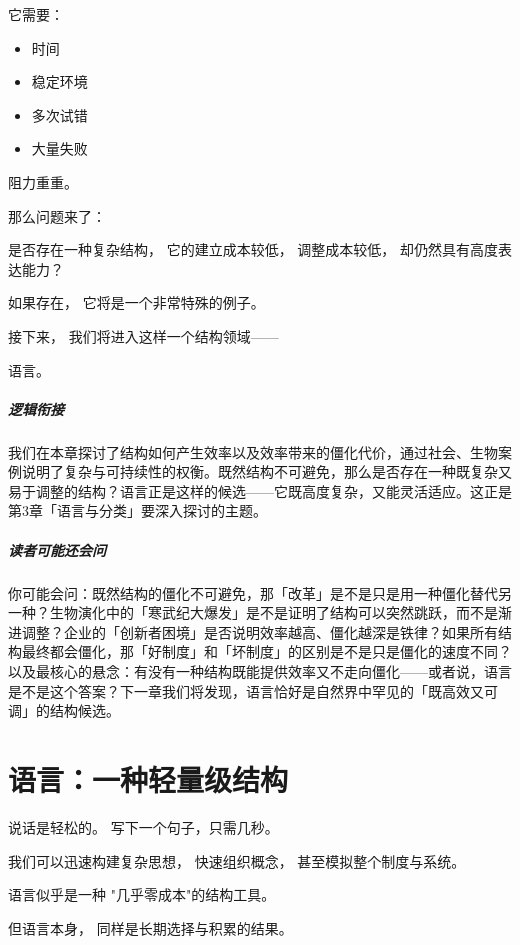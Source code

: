 \documentclass[openany, a4paper, 12pt]{book}
\newenvironment{motivation}{
	\vspace{0.5em}
	\begin{tcolorbox}[
		colback=gray!10,           %
		colframe=gray!60,          %
		title=\textit{本章动机 (Motivation)},
		fonttitle=\bfseries,
		arc=0mm,                   %
		leftrule=3mm               %
		]
		\small \itshape %
	}{
	\end{tcolorbox}
	\vspace{1em}
}
\begin{document}
它需要：

\begin{itemize}
	\item 时间
	\item 稳定环境
	\item 多次试错
	\item 大量失败
\end{itemize}

阻力重重。

那么问题来了：

\begin{questionbox}
	是否存在一种复杂结构，
	它的建立成本较低，
	调整成本较低，
	却仍然具有高度表达能力？
\end{questionbox}

如果存在，
它将是一个非常特殊的例子。

接下来，
我们将进入这样一个结构领域——

语言。

\paragraph*{逻辑衔接}
我们在本章探讨了结构如何产生效率以及效率带来的僵化代价，通过社会、生物案例说明了复杂与可持续性的权衡。既然结构不可避免，那么是否存在一种既复杂又易于调整的结构？语言正是这样的候选——它既高度复杂，又能灵活适应。这正是第3章「语言与分类」要深入探讨的主题。

\paragraph*{读者可能还会问}
你可能会问：既然结构的僵化不可避免，那「改革」是不是只是用一种僵化替代另一种？生物演化中的「寒武纪大爆发」是不是证明了结构可以突然跳跃，而不是渐进调整？企业的「创新者困境」是否说明效率越高、僵化越深是铁律？如果所有结构最终都会僵化，那「好制度」和「坏制度」的区别是不是只是僵化的速度不同？以及最核心的悬念：有没有一种结构既能提供效率又不走向僵化——或者说，语言是不是这个答案？下一章我们将发现，语言恰好是自然界中罕见的「既高效又可调」的结构候选。




	\chapter{语言：一种轻量级结构}

	\begin{motivation}
		说话是轻松的。
		写下一个句子，只需几秒。

		我们可以迅速构建复杂思想，
		快速组织概念，
		甚至模拟整个制度与系统。

		语言似乎是一种
		"几乎零成本"的结构工具。

		但语言本身，
		同样是长期选择与积累的结果。
	\end{motivation}
\end{document}
